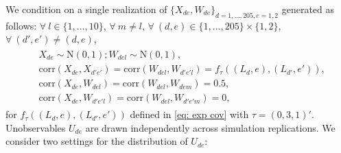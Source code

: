\documentclass[preprint]{imsart}
\numberwithin{equation}{section}
\theoremstyle{plain}
\theoremstyle{definition}
\renewcommand{\(}{\left(}
\renewcommand{\)}{\right)}
\renewcommand{\[}{\left[}
\renewcommand{\]}{\right]}
\begin{document}
We condition on a single realization of $\{X_{de},W_{de}\}_{d=1,\dots,205, e=1,2}$ generated as follows:
$\forall \ l\in \{ 1,\dots, 10\}$, $\forall \ m\ne l$,  $\forall \ (d,e)\in \{1,\dots,205 \}\times \{1,2\}$, $\forall \ (d',e')\ne (d,e)$,
\begin{align} \begin{split}
	&X_{de}\sim \mathrm N(0,1); W_{del}\sim \mathrm N(0,1), \\
	&\mathrm{corr}(X_{de},X_{d'e'})=\mathrm{corr}(W_{del},W_{d'e'l})=f_{\tau}( (L_d,e),(L_{d'},e')),\\%
	&\mathrm{corr}(X_{de},W_{del})=\mathrm{corr}(W_{del},W_{dem})=0.5,\\
	& \mathrm{corr}(X_{de},W_{d'e'l})=\mathrm{corr}(W_{del},W_{d'e'm})=0,
	\end{split} \end{align} 
for $f_{\tau}( (L_d,e),(L_{d'},e'))$ defined in \eqref{eq: exp cov} with $\tau = (0,3,1)'$.
Unobservables $U_{de}$ are drawn independently across simulation replications. We consider two settings for the distribution of $U_{de}$: 
\end{document}
